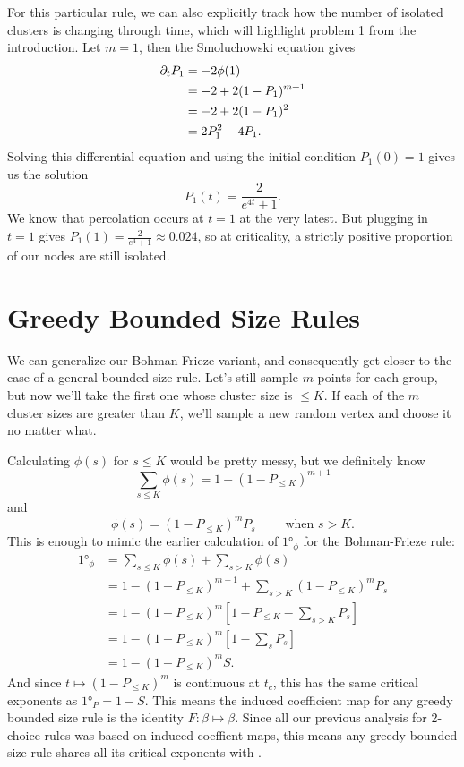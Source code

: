 \documentclass[twoside,10pt]{article}
\newcommand{\BF}{Bohman-Frieze\xspace}
\begin{document}
For this particular rule, we can also explicitly track how the number of isolated clusters is changing through time, which will highlight problem 1 from the introduction. Let $m=1$, then the Smoluchowski equation gives
\begin{align*}
	\partial_{t}{P_1} &= -2 \phi(1) \\
		    &= -2 + 2(1-P_1)^{m+1} \\
		    &= -2 + 2(1-P_1)^{2} \\
		    &= 2P_1^{2} - 4P_1.
\end{align*}
Solving this differential equation and using the initial condition $P_1(0)=1$ gives us the solution
\[
	P_1(t) = \frac{2}{e^{4t}+1} .
\] 
We know that percolation occurs at $t=1$ at the very latest. But plugging in $t=1$ gives $P_1(1) = \frac{2}{e^{4}+1} \approx 0.024$, so at criticality, a strictly positive proportion of our nodes are still isolated.

\section{Greedy Bounded Size Rules}

We can generalize our \BF variant, and consequently get closer to the case of a general bounded size rule. Let's still sample $m$ points for each group, but now we'll take the first one whose cluster size is $\leq K$. If each of the $m$ cluster sizes are greater than $K$, we'll sample a new random vertex and choose it no matter what.

Calculating $\phi(s)$ for $s \leq K$ would be pretty messy, but we definitely know
\[
	\sum_{s \leq K} \phi(s) = 1 - (1-P_{\leq K})^{m+1}
\] and
\[
	\phi(s) = (1-P_{\leq K})^{m}P_{s} \qquad \text{ when } s>K.
\] This is enough to mimic the earlier calculation of $\ang{1}_{\phi}$ for the \BF rule:
\begin{align*}
	\ang{1}_{\phi} &= \sum_{s \leq K}\phi(s) + \sum_{s > K}\phi(s) \\
		       &= 1 - (1-P_{\leq K})^{m+1} + \sum_{s>K}(1-P_{\leq K})^{m}P_s \\
		       &= 1 - (1-P_{\leq K})^{m} \left[ 1 - P_{\leq K}-\sum_{s>K}P_s \right] \\
		       &= 1 - (1-P_{\leq K})^{m} \left[ 1 - \sum_s P_s \right] \\
		       &= 1 - (1-P_{\leq K})^{m} S.
\end{align*}
And since $t \mapsto (1-P_{\leq K})^{m}$ is continuous at $t_c$, this has the same critical exponents as $\ang{1}_{P} = 1-S$. This means the induced coefficient map for any greedy bounded size rule is the identity $F:\beta\mapsto \beta$. Since all our previous analysis for 2-choice rules was based on induced coeffient maps, this means any greedy bounded size rule shares all its critical exponents with \ER.
\end{document}

